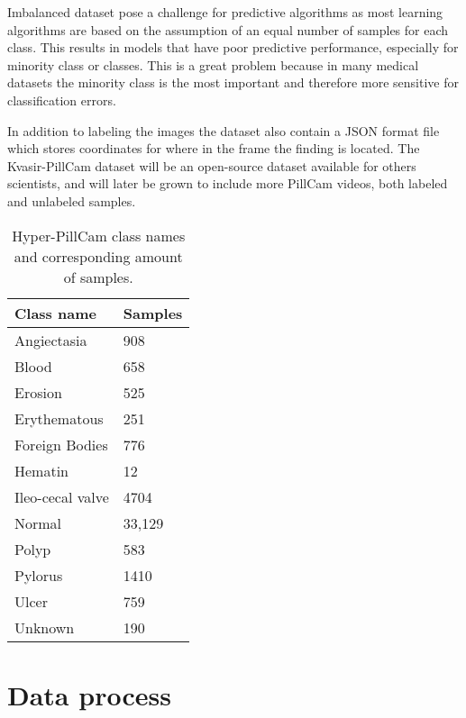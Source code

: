 \documentclass[thesis.tex]{subfiles}
\begin{document}
Imbalanced dataset pose a challenge for predictive algorithms as most learning algorithms are based on the assumption of an equal number of samples for each class. This results in models that have poor predictive performance, especially for minority class or classes. This is a great problem because in many medical datasets the minority class is the most important and therefore more sensitive for classification errors.

In addition to labeling the images the dataset also contain a JSON format file which stores coordinates for where in the frame the finding is located. The Kvasir-PillCam dataset will be an open-source dataset available for others scientists, and will later be grown to include more PillCam videos, both labeled and unlabeled samples.

\begin{table} %
  \centering
  \begin{tabular}{|l|l|}
  	\hline
  	Class name & Samples \\
    \hline
    Angiectasia		& 908 \\ 
    Blood			& 658 \\ 
    Erosion			& 525 \\ 
    Erythematous	& 251 \\
    Foreign Bodies	& 776 \\
    Hematin			& 12 \\
    Ileo-cecal valve& 4704 \\
    Normal			& 33,129 \\
    Polyp			& 583 \\
    Pylorus			& 1410 \\
    Ulcer			& 759 \\
    Unknown			& 190 \\
    \hline
  \end{tabular}
  \caption{Hyper-PillCam class names and corresponding amount of samples.}
  \label{table:kvasir_pillcam_samples}
\end{table}





\section{Data process} \label{sec:data_pipeline}
\end{document}
